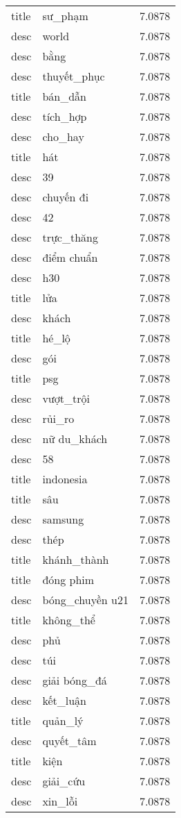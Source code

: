 \documentclass{article}
\begin{document}
\begin{tabular}{lll}
title & sư\_phạm & 7.0878\\
desc & world & 7.0878\\
desc & bằng & 7.0878\\
desc & thuyết\_phục & 7.0878\\
title & bán\_dẫn & 7.0878\\
desc & tích\_hợp & 7.0878\\
desc & cho\_hay & 7.0878\\
title & hát & 7.0878\\
desc & 39 & 7.0878\\
desc & chuyến đi & 7.0878\\
desc & 42 & 7.0878\\
desc & trực\_thăng & 7.0878\\
desc & điểm chuẩn & 7.0878\\
desc & h30 & 7.0878\\
title & lửa & 7.0878\\
desc & khách & 7.0878\\
title & hé\_lộ & 7.0878\\
desc & gói & 7.0878\\
title & psg & 7.0878\\
desc & vượt\_trội & 7.0878\\
desc & rủi\_ro & 7.0878\\
desc & nữ du\_khách & 7.0878\\
desc & 58 & 7.0878\\
title & indonesia & 7.0878\\
title & sâu & 7.0878\\
desc & samsung & 7.0878\\
desc & thép & 7.0878\\
title & khánh\_thành & 7.0878\\
title & đóng phim & 7.0878\\
desc & bóng\_chuyền u21 & 7.0878\\
title & không\_thể & 7.0878\\
desc & phủ & 7.0878\\
desc & túi & 7.0878\\
desc & giải bóng\_đá & 7.0878\\
desc & kết\_luận & 7.0878\\
title & quản\_lý & 7.0878\\
desc & quyết\_tâm & 7.0878\\
title & kiện & 7.0878\\
desc & giải\_cứu & 7.0878\\
desc & xin\_lỗi & 7.0878\\

\end{tabular}
\end{document}
